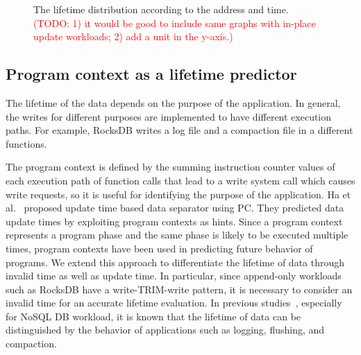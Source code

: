 \begin{figure}[t]
	\centering
	\vspace{-10pt}
	\caption{
		The lifetime distribution according to the address and time.
		\textcolor{red}{(TODO: 1) it would be good to include same graphs with
		in-place update workloads; 2) add a unit in the y-axis.)}}
		\label{fig:lba_lifetime}
	\vspace{-15pt}
\end{figure}


\subsection{Program context as a lifetime predictor}
The lifetime of the data depends on the purpose of the application. 
In general, the writes for different purposes are implemented to have different execution paths.
For example, RocksDB writes a log file and a compaction file in a different functions.

The program context is defined by the summing instruction counter values 
of each execution path of function calls that lead to a write system call which causes write requests,
so it is useful for identifying the purpose of the application. 
Ha et al.~\cite{PCHa} proposed update time based data separator using PC. 
They predicted data update times by exploiting program contexts as hints. 
Since a program context represents a program phase and the same phase is likely to be executed multiple times, 
program contexts have been used in predicting future behavior of programs. 
We extend this approach to differentiate the lifetime of data through invalid time as well as update time. 
In particular, since append-only workloads such as RocksDB have a write-TRIM-write pattern, 
it is necessary to consider an invalid time for an accurate lifetime evaluation.
In previous studies~\cite{MultiStream}, especially for NoSQL DB workload, 
it is known that the lifetime of data can be distinguished by the behavior of applications such as logging, 
flushing, and compaction. 

